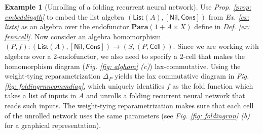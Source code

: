 \documentclass[11pt,a4paper,openright,twoside]{report}
\newcounter{mycounter}
\theoremstyle{plain}
\theoremstyle{definition}
\newtheorem{example}[mycounter]{Example}
\begin{document}
\begin{example}[Unrolling of a folding recurrent neural network]
  \label{ex: frnnunroll}
  Use \textit{Prop. \ref{prop: embeddingth}} to embed the list algebra $(\mathsf{List}(A), [\mathsf{Nil}, \mathsf{Cons}])$ from \textit{Ex. \ref{ex: lists}} as an algebra over the endofunctor $\mathbf{Para}(1 + A \times X)$ define in \textit{Def. \ref{ex: frnncell}}. Now consider an algebra homomorphism $(P,f): (\mathsf{List}(A), [\mathsf{Nil}, \mathsf{Cons}]) \to (S,(P,\mathsf{Cell}))$. Since we are working with algebras over a $2$-endofunctor, we also need to specify a $2$-cell that makes the homomorphism diagram (\textit{Fig. \ref{fig: alghom} (c)}) lax-commutative. Using the weight-tying reparametrization $\Delta_P$ yields the lax commutative diagram in \textit{Fig. \ref{fig: foldingrnncommdiag}}, which uniquely identifies $f$ as the fold function which takes a list of inputs in $A$ and unrolls a folding recurrent neural network that reads such inputs. The weight-tying reparametrization makes sure that each cell of the unrolled network uses the same parameters (see \textit{Fig. \ref{fig: foldingrnn} (b)} for a graphical representation). 
\end{example}
\end{document}
